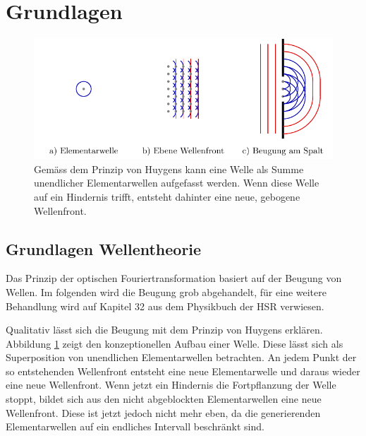 %
%
%
%
\section{Grundlagen\label{opt:section:grundlagen}}

\begin{figure}
    \centering
    \includegraphics[width=120mm]{papers/opt/images/huygens.pdf}
    \caption{Gemäss dem Prinzip von Huygens kann eine Welle als Summe unendlicher Elementarwellen aufgefasst werden.
    Wenn diese Welle auf ein Hindernis trifft, entsteht dahinter eine neue, gebogene Wellenfront.}
    \label{opt:fig:huygens}
\end{figure}

\subsection{Grundlagen Wellentheorie}
\label{opt:subsection:huygens}
Das Prinzip der optischen Fouriertransformation basiert auf der Beugung von Wellen.
Im folgenden wird die Beugung grob abgehandelt, für eine weitere Behandlung wird auf Kapitel 32 aus dem Physikbuch der HSR \cite{opt:HSR:Physik2} verwiesen.

Qualitativ lässt sich die Beugung mit dem Prinzip von Huygens erklären. 
Abbildung \ref{opt:fig:huygens} zeigt den konzeptionellen Aufbau einer Welle.
Diese lässt sich als Superposition von unendlichen Elementarwellen betrachten.
An jedem Punkt der so entstehenden Wellenfront entsteht eine neue Elementarwelle und daraus wieder eine neue Wellenfront.
Wenn jetzt ein Hindernis die Fortpflanzung der Welle stoppt, bildet sich aus den nicht abgeblockten Elementarwellen eine neue Wellenfront.
Diese ist jetzt jedoch nicht mehr eben, da die generierenden Elementarwellen auf ein endliches Intervall beschränkt sind.

